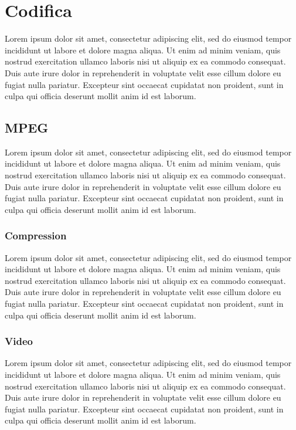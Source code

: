 \section{Codifica}
Lorem ipsum dolor sit amet, consectetur adipiscing elit, sed do eiusmod tempor incididunt ut labore et dolore magna aliqua. Ut enim ad minim veniam, quis nostrud exercitation ullamco laboris nisi ut aliquip ex ea commodo consequat. Duis aute irure dolor in reprehenderit in voluptate velit esse cillum dolore eu fugiat nulla pariatur. Excepteur sint occaecat cupidatat non proident, sunt in culpa qui officia deserunt mollit anim id est laborum.

\subsection{MPEG}
Lorem ipsum dolor sit amet, consectetur adipiscing elit, sed do eiusmod tempor incididunt ut labore et dolore magna aliqua. Ut enim ad minim veniam, quis nostrud exercitation ullamco laboris nisi ut aliquip ex ea commodo consequat. Duis aute irure dolor in reprehenderit in voluptate velit esse cillum dolore eu fugiat nulla pariatur. Excepteur sint occaecat cupidatat non proident, sunt in culpa qui officia deserunt mollit anim id est laborum.

\subsubsection{Compression}
Lorem ipsum dolor sit amet, consectetur adipiscing elit, sed do eiusmod tempor incididunt ut labore et dolore magna aliqua. Ut enim ad minim veniam, quis nostrud exercitation ullamco laboris nisi ut aliquip ex ea commodo consequat. Duis aute irure dolor in reprehenderit in voluptate velit esse cillum dolore eu fugiat nulla pariatur. Excepteur sint occaecat cupidatat non proident, sunt in culpa qui officia deserunt mollit anim id est laborum.

\subsubsection{Video}
Lorem ipsum dolor sit amet, consectetur adipiscing elit, sed do eiusmod tempor incididunt ut labore et dolore magna aliqua. Ut enim ad minim veniam, quis nostrud exercitation ullamco laboris nisi ut aliquip ex ea commodo consequat. Duis aute irure dolor in reprehenderit in voluptate velit esse cillum dolore eu fugiat nulla pariatur. Excepteur sint occaecat cupidatat non proident, sunt in culpa qui officia deserunt mollit anim id est laborum.

